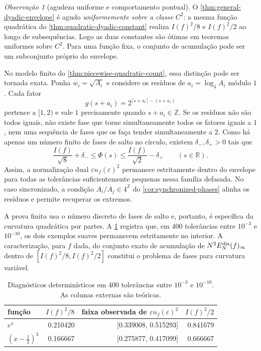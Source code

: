 \documentclass[11pt,a4paper]{article}
\theoremstyle{definition}
\theoremstyle{remark}
\newtheorem{remark}[theorem]{Observação}
\begin{document}
\begin{remark}[agudeza uniforme e comportamento pontual]
\label{rem:envelope-not-pointwise}
O \cref{thm:general-dyadic-envelope} é agudo \emph{uniformemente sobre a
classe} $C^2$: a mesma função quadrática do
\cref{thm:quadratic-dyadic-constant} realiza $I(f)^2/8$ e $I(f)^2/2$ ao longo
de subsequências. Logo as duas constantes são ótimas em teoremas uniformes
sobre $C^2$. Para uma função fixa, o conjunto de acumulação pode ser um
subconjunto próprio do envelope.

No modelo finito do \cref{thm:piecewise-quadratic-count}, essa distinção pode
ser tornada exata. Ponha $w_i=\sqrt{A_i}$ e considere os resíduos de
$a_i=\log_4A_i$ módulo $1$. Cada fator
\[
 g(s+a_i)=2^{\lceil s+a_i\rceil-(s+a_i)}
\]
pertence a $[1,2)$ e vale $1$ precisamente quando $s+a_i\in\mathbb Z$. Se os
resíduos não são todos iguais, não existe fase que torne simultaneamente
todos os fatores iguais a $1$, nem uma sequência de fases que os faça tender
simultaneamente a $2$. Como há apenas um número finito de fases de salto no
círculo, existem $\delta_-,\delta_+>0$ tais que
\[
 \frac{I(f)}{\sqrt8}+\delta_-
 \le \Phi(s)
 \le \frac{I(f)}{\sqrt2}-\delta_+
 \qquad(s\in\mathbb R).
\]
Assim, a normalização dual $\varepsilon n_f(\varepsilon)^2$ permanece
estritamente dentro do envelope para todas as tolerâncias suficientemente
pequenas nessa família defasada. No caso sincronizado, a condição
$A_i/A_j\in4^{\mathbb Z}$ do \cref{cor:synchronized-phases} alinha os
resíduos e permite recuperar os extremos.

A prova finita usa o número discreto de fases de salto e, portanto, é
específica da curvatura quadrática por partes. A
\cref{tab:smooth-diagnostics} registra que, em $400$ tolerâncias entre
$10^{-3}$ e $10^{-10}$, os dois exemplos suaves permanecem estritamente no
interior. A caracterização, para $f$ dada, do conjunto exato de acumulação de
$N^2E_N^{\rm dia}(f)_\infty$ dentro de
$[I(f)^2/8,I(f)^2/2]$ constitui o problema de fases para curvatura variável.
\end{remark}

\begin{table}[t]
 \centering
 \caption{Diagnósticos determinísticos em 400 tolerâncias entre
 $10^{-3}$ e $10^{-10}$. As colunas externas são teóricas.}
 \label{tab:smooth-diagnostics}
 \small
 \begin{tabular}{lrrr}
\toprule
função & $I(f)^2/8$ & faixa observada de $\varepsilon n_f(\varepsilon)^2$ & $I(f)^2/2$ \\
\midrule
$e^x$ & 0.210420 & [0.339008, 0.515293] & 0.841679 \\
$(x-\frac{1}{2})^3$ & 0.166667 & [0.275877, 0.417099] & 0.666667 \\
\bottomrule
\end{tabular}

\end{table}
\end{document}
